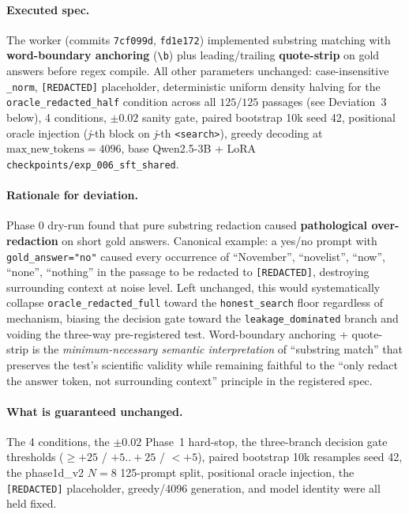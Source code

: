 \paragraph{Executed spec.}
The worker (commits \texttt{7cf099d}, \texttt{fd1e172}) implemented substring matching with \textbf{word-boundary anchoring} (\verb|\b|) plus leading/trailing \textbf{quote-strip} on gold answers before regex compile. All other parameters unchanged: case-insensitive \texttt{\_norm}, \texttt{[REDACTED]} placeholder, deterministic uniform density halving for the \texttt{oracle\_redacted\_half} condition across all $125/125$ passages (see Deviation~3 below), 4 conditions, $\pm 0.02$ sanity gate, paired bootstrap 10k seed 42, positional oracle injection (\textit{j}-th block on \textit{j}-th \texttt{<search>}), greedy decoding at $\text{max\_new\_tokens}=4096$, base Qwen2.5-3B + LoRA \texttt{checkpoints/exp\_006\_sft\_shared}.

\paragraph{Rationale for deviation.}
Phase 0 dry-run found that pure substring redaction caused \textbf{pathological over-redaction} on short gold answers. Canonical example: a yes/no prompt with \texttt{gold\_answer="no"} caused every occurrence of ``November'', ``novelist'', ``now'', ``none'', ``nothing'' in the passage to be redacted to \texttt{[REDACTED]}, destroying surrounding context at noise level. Left unchanged, this would systematically collapse \texttt{oracle\_redacted\_full} toward the \texttt{honest\_search} floor regardless of mechanism, biasing the decision gate toward the \texttt{leakage\_dominated} branch and voiding the three-way pre-registered test. Word-boundary anchoring + quote-strip is the \emph{minimum-necessary semantic interpretation} of ``substring match'' that preserves the test's scientific validity while remaining faithful to the ``only redact the answer token, not surrounding context'' principle in the registered spec.

\paragraph{What is guaranteed unchanged.}
The 4 conditions, the $\pm 0.02$ Phase~1 hard-stop, the three-branch decision gate thresholds ($\geq +25$ / $+5..+25$ / $< +5$), paired bootstrap 10k resamples seed 42, the phase1d\_v2 $N{=}8$ 125-prompt split, positional oracle injection, the \texttt{[REDACTED]} placeholder, greedy/4096 generation, and model identity were all held fixed.


